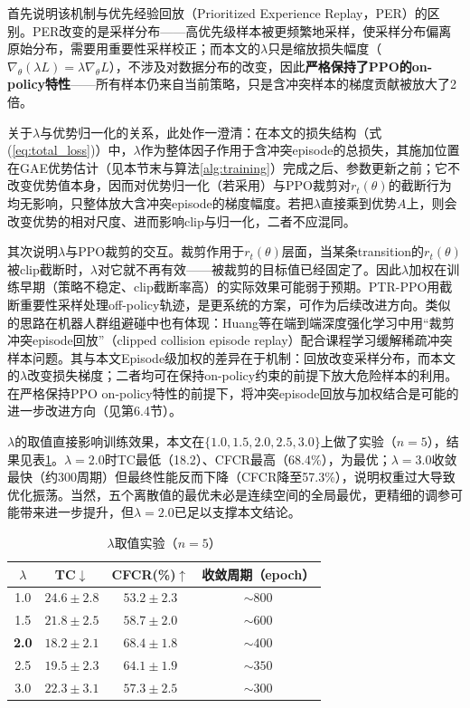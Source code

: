 \documentclass[12pt,a4paper,UTF8]{ctexart}
\begin{document}
首先说明该机制与优先经验回放（Prioritized Experience Replay，PER）的区别。PER改变的是采样分布——高优先级样本被更频繁地采样，使采样分布偏离原始分布，需要用重要性采样校正；而本文的$\lambda$只是缩放损失幅度（$\nabla_\theta(\lambda L)=\lambda\nabla_\theta L$），不涉及对数据分布的改变，因此\textbf{严格保持了PPO的on-policy特性}——所有样本仍来自当前策略，只是含冲突样本的梯度贡献被放大了2倍。

关于$\lambda$与优势归一化的关系，此处作一澄清：在本文的损失结构（式(\ref{eq:total_loss})）中，$\lambda$作为整体因子作用于含冲突episode的总损失，其施加位置在GAE优势估计（见本节末与算法\ref{alg:training}）完成之后、参数更新之前；它不改变优势值本身，因而对优势归一化（若采用）与PPO裁剪对$r_t(\theta)$的截断行为均无影响，只整体放大含冲突episode的梯度幅度。若把$\lambda$直接乘到优势$A$上，则会改变优势的相对尺度、进而影响clip与归一化，二者不应混同。

其次说明$\lambda$与PPO裁剪的交互。裁剪作用于$r_t(\theta)$层面，当某条transition的$r_t(\theta)$被clip截断时，$\lambda$对它就不再有效——被裁剪的目标值已经固定了。因此$\lambda$加权在训练早期（策略不稳定、clip截断率高）的实际效果可能弱于预期。PTR-PPO\cite{ref27}用截断重要性采样处理off-policy轨迹，是更系统的方案，可作为后续改进方向。类似的思路在机器人群组避碰中也有体现：Huang等\cite{ref58}在端到端深度强化学习中用“裁剪冲突episode回放”（clipped collision episode replay）配合课程学习缓解稀疏冲突样本问题。其与本文Episode级加权的差异在于机制：回放改变采样分布，而本文的$\lambda$改变损失梯度；二者均可在保持on-policy约束的前提下放大危险样本的利用。在严格保持PPO on-policy特性的前提下，将冲突episode回放与加权结合是可能的进一步改进方向（见第6.4节）。

$\lambda$的取值直接影响训练效果，本文在$\{1.0, 1.5, 2.0, 2.5, 3.0\}$上做了实验（$n=5$），结果见表\ref{tab:lambda}。$\lambda=2.0$时TC最低（18.2）、CFCR最高（68.4\%），为最优；$\lambda=3.0$收敛最快（约300周期）但最终性能反而下降（CFCR降至57.3\%），说明权重过大导致优化振荡。当然，五个离散值的最优未必是连续空间的全局最优，更精细的调参可能带来进一步提升，但$\lambda=2.0$已足以支撑本文结论。

\begin{table}[H]
    \centering
    \caption{$\lambda$取值实验（$n=5$）}
    \label{tab:lambda}
    \begin{tabular}{|c|c|c|c|}
        \hline
        $\lambda$ & TC$\downarrow$ & CFCR(\%)$\uparrow$ & 收敛周期（epoch） \\
        \hline
        1.0 & $24.6\pm2.8$ & $53.2\pm2.3$ & $\sim800$ \\
        1.5 & $21.8\pm2.5$ & $58.7\pm2.0$ & $\sim600$ \\
        \textbf{2.0} & $\mathbf{18.2\pm2.1}$ & $\mathbf{68.4\pm1.8}$ & $\sim400$ \\
        2.5 & $19.5\pm2.3$ & $64.1\pm1.9$ & $\sim350$ \\
        3.0 & $22.3\pm3.1$ & $57.3\pm2.5$ & $\sim300$ \\
        \hline
    \end{tabular}
\end{table}
\end{document}
